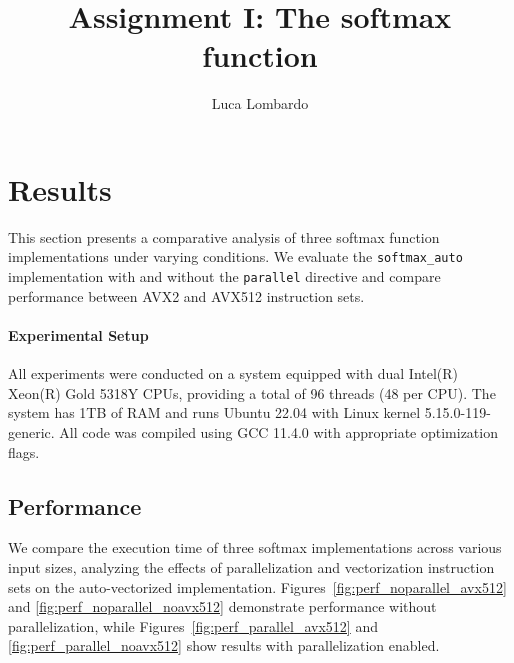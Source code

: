 \documentclass[10pt]{report}
\title{Assignment I: The softmax function}
\author{Luca Lombardo}
\begin{document}


\setlength{\parindent}{0em}
\setlength{\parskip}{-0.5em}

\section*{Results}
This section presents a comparative analysis of three softmax function implementations under varying conditions. We evaluate the \texttt{softmax\_auto} implementation with and without the \texttt{parallel} directive and compare performance between AVX2 and AVX512 instruction sets.

\paragraph{Experimental Setup} All experiments were conducted on a system equipped with dual Intel(R) Xeon(R) Gold 5318Y CPUs, providing a total of 96 threads (48 per CPU). The system has 1TB of RAM and runs Ubuntu 22.04 with Linux kernel 5.15.0-119-generic. All code was compiled using GCC 11.4.0 with appropriate optimization flags.

\subsection*{Performance}

We compare the execution time of three softmax implementations across various input sizes, analyzing the effects of parallelization and vectorization instruction sets on the auto-vectorized implementation. Figures~\ref{fig:perf_noparallel_avx512} and \ref{fig:perf_noparallel_noavx512} demonstrate performance without parallelization, while Figures~\ref{fig:perf_parallel_avx512} and \ref{fig:perf_parallel_noavx512} show results with parallelization enabled.
\end{document}
